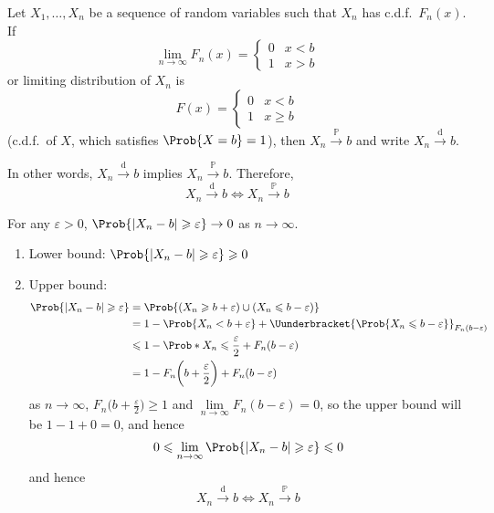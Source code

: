 \begin{Theorem}{}{}
    Let $ X_1,\ldots,X_n $ be a sequence of random variables
    such that $ X_n $ has c.d.f.\ $ F_n(x) $. If
    \[ \lim\limits_{{n} \to {\infty}} F_n(x)=\begin{cases}
            0 & x<b \\
            1 & x>b
        \end{cases} \]
    or limiting distribution of $ X_n $ is
    \[ F(x)=\begin{cases}
            0 & x<b          \\
            1 & x\geqslant b
        \end{cases} \]
    (c.d.f.\ of $ X $, which satisfies $ \Prob{X=b}=1 $), then
    $ X_n\stackrel{\mathbb{P}}{\to}b $ and write
    $ X_n\stackrel{\text{d}}{\to}b $.

    In other words, $ X_n\stackrel{\text{d}}{\to}b $ implies
    $ X_n\stackrel{\mathbb{P}}{\to}b $. Therefore,
    \[ X_n\stackrel{\text{d}}{\to}b\iff X_n\stackrel{\mathbb{P}}{\to}b \]
\end{Theorem}
\begin{Proof}{}{}
    For any $ \varepsilon>0 $, $ \Prob{\abs{X_n-b}\geqslant \varepsilon}\to 0 $
    as $ n\to\infty $.
    \begin{enumerate}[label=(\roman*)]
        \item Lower bound: $ \Prob{\abs{X_n-b}\geqslant \varepsilon}\geqslant 0 $
        \item Upper bound:
              \begin{align*}
                  \Prob{\abs{X_n-b}\geqslant \varepsilon}
                   & =\Prob{(X_n\geqslant b+\varepsilon)\cup (X_n\leqslant b-\varepsilon)}     \\
                   & =1-\Prob{X_n<b+\varepsilon}+
                  \Uunderbracket{\Prob{X_n\leqslant b-\varepsilon}}_{F_n(b-\varepsilon)}       \\
                   & \leqslant 1-\Prob*{X_n\leqslant \frac{\varepsilon}{2}}+F_n(b-\varepsilon) \\
                   & =1-F_n\biggl(b+\frac{\varepsilon}{2}\biggr)+F_n(b-\varepsilon)
              \end{align*}
              as $ n\to\infty $, $ F_n\biggl(b+\frac{\varepsilon}{2}\biggr)\geqslant 1 $
              and $ \lim\limits_{{n} \to {\infty}} F_n(b-\varepsilon)=0 $,
              so the upper bound will be $ 1-1+0=0 $, and hence
              \[ 0\leqslant \lim\limits_{{n} \to {\infty}} \Prob{\abs{X_n-b}\geqslant \varepsilon}
                  \leqslant 0 \]
              and hence
              \[ X_n\stackrel{\text{d}}{\to}b\iff X_n\stackrel{\mathbb{P}}{\to}b \]
    \end{enumerate}
\end{Proof}
